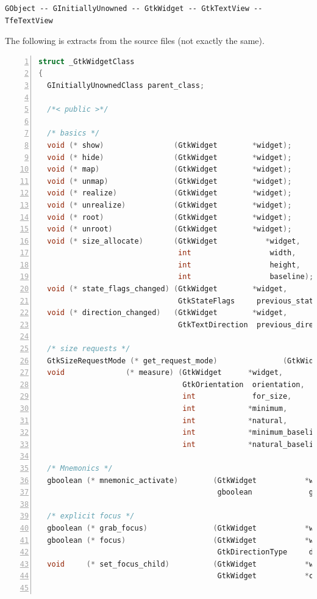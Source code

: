 \begin{lstlisting}
GObject -- GInitiallyUnowned -- GtkWidget -- GtkTextView -- TfeTextView
\end{lstlisting}

The following is extracts from the source files (not exactly the same).

\begin{lstlisting}[language=C, numbers=left]
struct _GtkWidgetClass
{
  GInitiallyUnownedClass parent_class;

  /*< public >*/

  /* basics */
  void (* show)                (GtkWidget        *widget);
  void (* hide)                (GtkWidget        *widget);
  void (* map)                 (GtkWidget        *widget);
  void (* unmap)               (GtkWidget        *widget);
  void (* realize)             (GtkWidget        *widget);
  void (* unrealize)           (GtkWidget        *widget);
  void (* root)                (GtkWidget        *widget);
  void (* unroot)              (GtkWidget        *widget);
  void (* size_allocate)       (GtkWidget           *widget,
                                int                  width,
                                int                  height,
                                int                  baseline);
  void (* state_flags_changed) (GtkWidget        *widget,
                                GtkStateFlags     previous_state_flags);
  void (* direction_changed)   (GtkWidget        *widget,
                                GtkTextDirection  previous_direction);

  /* size requests */
  GtkSizeRequestMode (* get_request_mode)               (GtkWidget      *widget);
  void              (* measure) (GtkWidget      *widget,
                                 GtkOrientation  orientation,
                                 int             for_size,
                                 int            *minimum,
                                 int            *natural,
                                 int            *minimum_baseline,
                                 int            *natural_baseline);

  /* Mnemonics */
  gboolean (* mnemonic_activate)        (GtkWidget           *widget,
                                         gboolean             group_cycling);

  /* explicit focus */
  gboolean (* grab_focus)               (GtkWidget           *widget);
  gboolean (* focus)                    (GtkWidget           *widget,
                                         GtkDirectionType     direction);
  void     (* set_focus_child)          (GtkWidget           *widget,
                                         GtkWidget           *child);


\end{lstlisting}

